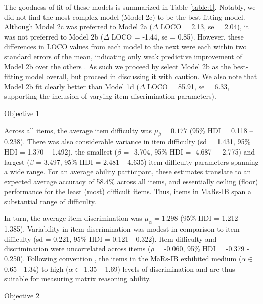 \documentclass[a4paper,man,natbib]{apa6}
\makeatletter
\renewcommand{\subsubsection}{\@startsection{subsubsection}{3}
  {\z@}%
  {\b@level@two@skip}{\e@level@two@skip}%
  {\normalfont\normalsize\bfseries}}
\makeatother
\begin{document}
The goodness-of-fit of these models is summarized in Table \ref{table:1}. Notably, we did not find the most complex model (Model 2c) to be the best-fitting model. Although Model 2c was preferred to Model 2a ($\Delta$ LOCO = 2.13, se = 2.04), it was not preferred to Model 2b ($\Delta$ LOCO = -1.44, se = 0.85).
However, these differences in LOCO values from each model to the next were each within two standard errors of the mean, indicating only weak predictive improvement of Model 2b over the others \citep{vehtari2022cv}. As such we proceed by select Model 2b as the best-fitting model overall, but proceed in discussing it with caution. We also note that Model 2b fit clearly better than Model 1d ($\Delta$ LOCO = 85.91, se = 6.33, supporting the inclusion of varying item discrimination parameters).

\subsubsection{Objective 1}

Across all items, the average item difficulty was $\mu_\beta = 0.177$ (95\% HDI = 0.118 -- 0.238). There was also considerable variance in item difficulty (sd = 1.431, 95\% HDI = 1.370 -- 1.492), the smallest ($\beta$ = -3.704, 95\% HDI = -4.687 -- -2.775) and largest ($\beta$ = 3.497, 95\% HDI = 2.481 -- 4.635) item difficulty parameters spanning a wide range. For an average ability participant, these estimates translate to an expected average accuracy of 58.4\% across all items, and essentially ceiling (floor) performance for the least (most) difficult items. Thus, items in MaRs-IB span a substantial range of difficulty. 

In turn, the average item discrimination was $\mu_\alpha = 1.298$ (95\% HDI = 1.212 - 1.385). Variability in item discrimination was modest in comparison to item difficulty (sd = 0.221, 95\% HDI = 0.121 - 0.322). Item difficulty and discrimination were uncorrelated across items ($\rho$ = -0.060, 95\% HDI = -0.379 - 0.250). Following convention \citep{baker2017basics}, the items in the MaRs-IB exhibited medium ($\alpha \in$ 0.65 - 1.34) to high ($\alpha \in$ 1.35 – 1.69) levels of discrimination and are thus suitable for measuring matrix reasoning ability.

\subsubsection{Objective 2}
\end{document}
